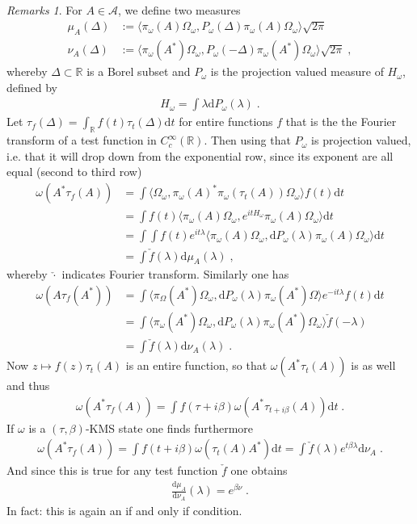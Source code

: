 \documentclass[
a4paper, %
11pt, %
onecolumn, %
openany, %
]{memoir}
\theoremstyle{definition}
\theoremstyle{remark}
\newtheorem{remarks}[definition]{Remarks}
\theoremstyle{plain}
\begin{document}
\begin{remarks}
	For $A\in\mathcal{A}$, we define two measures\begin{align}
	\mu_A(\Delta)&:=\langle\pi_{\omega}(A)\Omega_{\omega},P_{\omega}(\Delta)\pi_{\omega}(A)\Omega_{\omega}\rangle \sqrt{2\pi}\\
	\nu_A(\Delta)&:=\langle \pi_{\omega}(A^*)\Omega_{\omega},P_{\omega}(-\Delta)\pi_{\omega}(A^*)\Omega_{\omega}\rangle \sqrt{2\pi}	\; ,
	\end{align}
whereby $\Delta\subset\mathbb{R}$ is a Borel subset and $P_{\omega}$ is the projection valued measure of $H_{\omega}$, defined by \begin{align}
H_{\omega}=\int\lambda \mathrm{d}P_{\omega}(\lambda)\; .
\end{align}
Let $\tau_f(\Delta)=\int_{\mathbb{R}}f(t)\tau_t(\Delta)\mathrm{d}t$ for entire functions $f$ that is the the Fourier transform of a test function in $C_c^{\infty}(\mathbb{R})$. Then using that $P_{\omega}$ is projection valued, i.e. that it will drop down from the exponential row, since its exponent are all equal (second to third row)\begin{align}
\omega(A^*\tau_f(A))&=\int\langle \Omega_{\omega},\pi_{\omega}(A)^*\pi_{\omega}(\tau_t(A))\Omega_{\omega}\rangle f(t)\mathrm{d}t\\
&=\int f(t)\langle \pi_{\omega}(A)\Omega_{\omega},e^{itH_{\omega}}\pi_{\omega}(A)\Omega_{\omega}\rangle\mathrm{d}t\\
&=\int\int f(t)e^{it\lambda}\langle\pi_{\omega}(A)\Omega_{\omega},\mathrm{d}P_{\omega}(\lambda)\pi_{\omega}(A)\Omega_{\omega}\rangle\mathrm{d}t\\
&=\int \check{f}(\lambda)\mathrm{d}\mu_{A}(\lambda)\;,
\end{align}
whereby $\check{\cdot}$ indicates Fourier transform. Similarly one has \begin{align}
\omega(A\tau_f(A^*))&=\int \langle \pi_{\Omega}(A^*)\Omega_{\omega},\mathrm{d}P_{\omega}(\lambda)\pi_{\omega}(A^*)\Omega\rangle e^{-it\lambda}f(t)\mathrm{d}t\\
&=\int \langle \pi_{\omega}(A^*)\Omega_{\omega},\mathrm{d}P_{\omega}(\lambda) \pi_{\omega}(A^*)\Omega_{\omega}\rangle\check{f}(-\lambda)\\
&=\int \check{f}(\lambda)\mathrm{d}\nu_A(\lambda)\; .
\end{align}
Now $z\mapsto f(z)\tau_t(A)$ is an entire function, so that $\omega(A^*\tau_t(A))$ is as well and thus \begin{align}
\omega(A^*\tau_f(A))=\int f(\tau+i\beta)\omega(A^*\tau_{t+i\beta}(A))\mathrm{d}t\; .
\end{align}
If $\omega$ is a $(\tau,\beta)$-KMS state one finds furthermore \begin{align}
\omega(A^*\tau_f(A))=\int f(t+i\beta)\omega(\tau_t(A)A^*)\mathrm{d}t=\int\check{f}(\lambda)e^{t\beta \lambda}\mathrm{d}\nu_A\; .
\end{align}
And since this is true for any test function $\check{f}$ one obtains \begin{align}
\frac{\mathrm{d}\mu_{A}}{\mathrm{d}\nu_{A}}(\lambda)=e^{\beta\nu}\; .
\end{align}
In fact: this is again an if and only if condition. \end{remarks}
\end{document}
